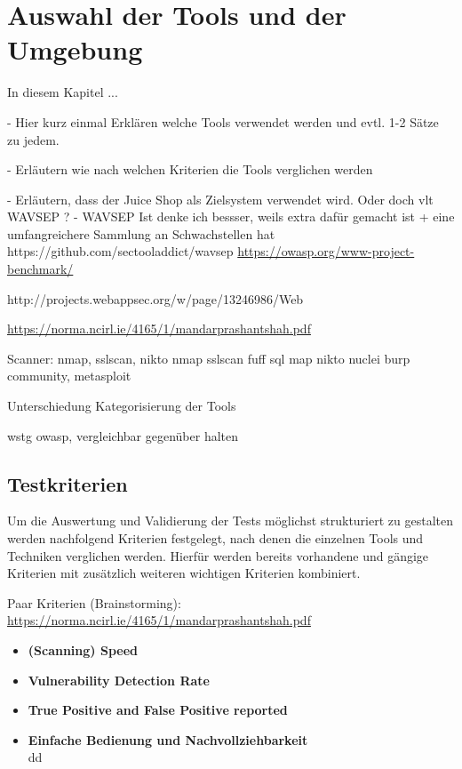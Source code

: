 \chapter{Auswahl der Tools und der Umgebung}

In diesem Kapitel ...

- Hier kurz einmal Erklären welche Tools verwendet werden und evtl. 1-2 Sätze zu jedem.

- Erläutern wie nach welchen Kriterien die Tools verglichen werden

- Erläutern, dass der Juice Shop als Zielsystem verwendet wird. Oder doch vlt WAVSEP ? - WAVSEP Ist denke ich bessser, weils extra dafür gemacht ist + eine umfangreichere Sammlung an Schwachstellen hat
https://github.com/sectooladdict/wavsep
\url{https://owasp.org/www-project-benchmark/}

http://projects.webappsec.org/w/page/13246986/Web%

\url{https://norma.ncirl.ie/4165/1/mandarprashantshah.pdf}


Scanner: nmap, sslscan, nikto
nmap
sslscan
fuff
sql map
nikto
nuclei
burp community,
metasploit

Unterschiedung Kategorisierung der Tools

wstg owasp, vergleichbar gegenüber halten


\section{Testkriterien}

Um die Auswertung und Validierung der Tests möglichst strukturiert zu gestalten werden nachfolgend Kriterien festgelegt, nach denen die einzelnen Tools und Techniken verglichen werden.
Hierfür werden bereits vorhandene und gängige Kriterien mit zusätzlich weiteren wichtigen Kriterien kombiniert.

Paar Kriterien (Brainstorming):
\url{https://norma.ncirl.ie/4165/1/mandarprashantshah.pdf}
\begin{itemize}
	\item \textbf{(Scanning) Speed} 
	\item \textbf{Vulnerability Detection Rate} 
	\item \textbf{True Positive and False Positive reported} 
	\item \textbf{Einfache Bedienung und Nachvollziehbarkeit} \\
	dd
\end{itemize}



